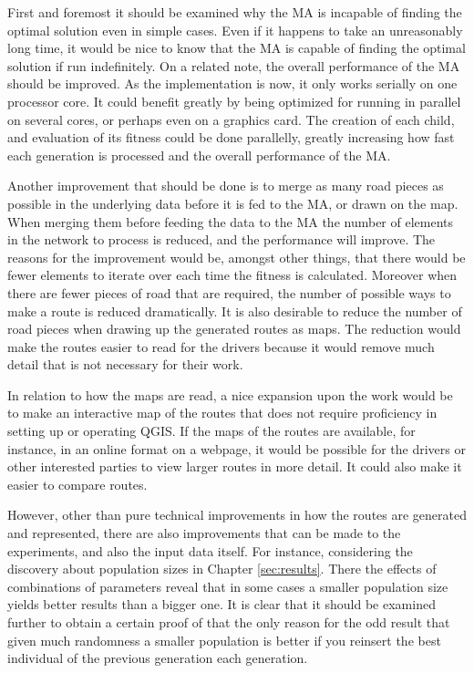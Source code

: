 First and foremost it should be examined why the MA is incapable of finding the optimal solution even in simple cases. Even if it happens to take an unreasonably long time, it would be nice to know that the MA is capable of finding the optimal solution if run indefinitely. On a related note, the overall performance of the MA should be improved. As the implementation is now, it only works serially on one processor core. It could benefit greatly by being optimized for running in parallel on several cores, or perhaps even on a graphics card. The creation of each child, and evaluation of its fitness could be done parallelly, greatly increasing how fast each generation is processed and the overall performance of the MA.

Another improvement that should be done is to merge as many road pieces as possible in the underlying data before it is fed to the MA, or drawn on the map. When merging them before feeding the data to the MA the number of elements in the network to process is reduced, and the performance will improve. The reasons for the improvement would be, amongst other things, that there would be fewer elements to iterate over each time the fitness is calculated. Moreover when there are fewer pieces of road that are required, the number of possible ways to make a route is reduced dramatically. It is also desirable to reduce the number of road pieces when drawing up the generated routes as maps. The reduction would make the routes easier to read for the drivers because it would remove much detail that is not necessary for their work.

In relation to how the maps are read, a nice expansion upon the work would be to make an interactive map of the routes that does not require proficiency in setting up or operating QGIS. If the maps of the routes are available, for instance, in an online format on a webpage, it would be possible for the drivers or other interested parties to view larger routes in more detail. It could also make it easier to compare routes.

However, other than pure technical improvements in how the routes are generated and represented, there are also improvements that can be made to the experiments, and also the input data itself. 
For instance, considering the discovery about population sizes in Chapter \ref{sec:results}. There the effects of combinations of parameters reveal that in some cases a smaller population size yields better results than a bigger one. It is clear that it should be examined further to obtain a certain proof of that the only reason for the odd result that given much randomness a smaller population is better if you reinsert the best individual of the previous generation each generation.

